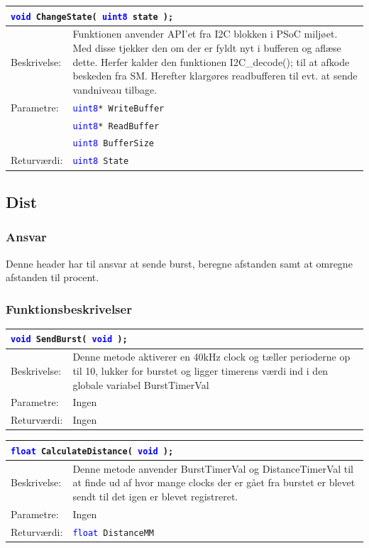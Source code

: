 \begin{table}[H]
\begin{tabular}{l p{12.5cm}}
\multicolumn{2}{l}{\texttt{\textcolor{blue}{void} ChangeState( \textcolor{blue}{uint8} state );}} \\
\hline
Beskrivelse:& Funktionen anvender API'et fra I2C blokken i PSoC miljøet. Med disse tjekker den om der er fyldt nyt i bufferen og aflæse dette. Herfer kalder den funktionen I2C\_decode(); til at afkode beskeden fra SM. Herefter klargøres readbufferen til evt. at sende vandniveau tilbage. \\
Parametre:&\texttt{\textcolor{blue}{uint8}* WriteBuffer}\\
&\texttt{\textcolor{blue}{uint8}* ReadBuffer}\\
&\texttt{\textcolor{blue}{uint8} BufferSize} \\
Returværdi:&\texttt{\textcolor{blue}{uint8} State}\\
\end{tabular}
\end{table}

\subsection{Dist}
\subsubsection{Ansvar}
Denne header har til ansvar at sende burst, beregne afstanden samt at omregne afstanden til procent.
\subsubsection{Funktionsbeskrivelser}

\begin{table}[H]
\begin{tabular}{l p{12.5cm}}
\multicolumn{2}{l}{\texttt{\textcolor{blue}{void} SendBurst( \textcolor{blue}{void} );}} \\
\hline
Beskrivelse:&Denne metode aktiverer en 40kHz clock og tæller perioderne op til 10, lukker for burstet og ligger timerens værdi ind i den globale variabel BurstTimerVal\\
Parametre:&Ingen\\
Returværdi:&Ingen\\
\end{tabular}
\end{table}

\begin{table}[H]
\begin{tabular}{l p{12.5cm}}
\multicolumn{2}{l}{\texttt{\textcolor{blue}{float} CalculateDistance( \textcolor{blue}{void} );}} \\
\hline
Beskrivelse:&Denne metode anvender BurstTimerVal og DistanceTimerVal til at finde ud af hvor mange clocks der er gået fra burstet er blevet sendt til det igen er blevet registreret.\\
Parametre:&Ingen\\
Returværdi:&\texttt{\textcolor{blue}{float} DistanceMM}\\
\end{tabular}
\end{table}

